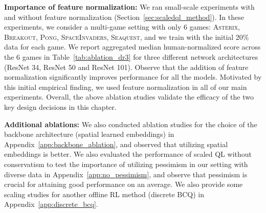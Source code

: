 \textbf{Importance of feature normalization:} We ran small-scale experiments with and without feature normalization (Section~\ref{sec:scaledql_method}). In these experiments, we consider a multi-game setting with only 6 games: \textsc{Asterix}, \textsc{Breakout}, \textsc{Pong}, \textsc{SpaceInvaders}, \textsc{Seaquest}, and we train with the initial 20\% data for each game. We report aggregated median human-normalized score across the 6 games in Table~\ref{tab:ablation_dr3} for three different network architectures (ResNet 34, ResNet 50 and ResNet 101). Observe that the addition of feature normalization significantly improves performance for all the models. Motivated by this initial empirical finding, we used feature normalization in all of our main experiments. Overall, the above ablation studies validate the efficacy of the two key design decisions in this chapter. 

\begin{table}[ht]
    \centering
    \centering
    \vspace{-0.2cm}
    \caption{\footnotesize{\textbf{Performance of Scaled QL with and without feature normalization in the 6 game setting} reported in terms of the median human-normalized score. Observe that with models of all sizes, the addition of feature normalization improves performance.}}
    \label{tab:ablation_dr3}
    \vspace{0.1cm}
\end{table}

\textbf{Additional ablations:} We also conducted ablation studies for the choice of the backbone architecture (spatial learned embeddings) in Appendix~\ref{app:backbone_ablation}, and observed that utilizing spatial embeddings is better. We also evaluated the performance of scaled QL without conservatism to test the importance of utilizing pessimism in our setting with diverse data in Appendix~\ref{app:no_pessimism}, and observe that pessimism is crucial for attaining good performance on an average. We also provide some scaling studies for another offline RL method (discrete BCQ) in Appendix~\ref{app:discrete_bcq}.